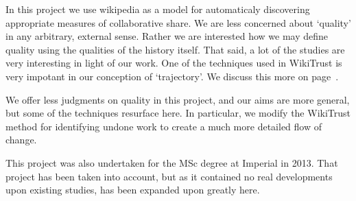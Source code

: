In this project we use wikipedia as a model for automaticaly
discovering appropriate measures of collaborative share. We are less
concerned about `quality' in any arbitrary, external sense. Rather we
are interested how we may define quality using the qualities of the
history itself. That said, a lot of the studies are very interesting
in light of our work. One of the techniques used in WikiTrust is very
impotant in our conception of `trajectory'. We discuss this more on
page~\pageref{sec:wikipedia}.

We offer less judgments on quality in this project, and our aims are
more general, but some of the techniques resurface here. In
particular, we modify the WikiTrust method for identifying undone work
to create a much more detailed flow of change.

This project was also undertaken for the MSc degree at Imperial in
2013. That project has been taken into account, but as it contained no
real developments upon existing studies, has been expanded upon
greatly here.
